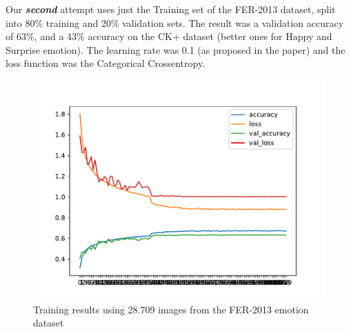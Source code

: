 \documentclass[runningheads,a4paper,11pt]{report}
\begin{document}
Our \textbf{\emph{second}} attempt uses just the Training set of the FER-2013 dataset, split into 80\% training and 20\% validation sets. The result was a validation accuracy of 63\%, and a 43\% accuracy on the CK+ dataset (better ones for Happy and Surprise emotion). The learning rate was 0.1 (as proposed in the paper) and the loss function was the Categorical Crossentropy.
\begin{figure}[htbp]
\begin{center}
	\includegraphics[scale=0.8]{Fig/fer_training_28k_01.pdf}
	\caption{Training results using 28.709 images from the FER-2013 emotion dataset}
	\label{fer_training_28k_01}
\end{center}
\end{figure}
\end{document}
